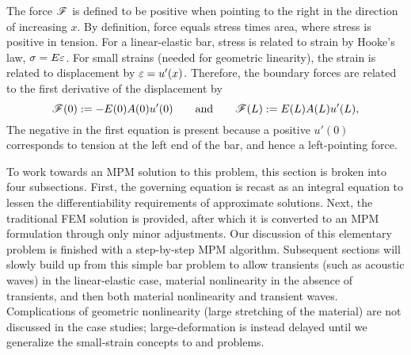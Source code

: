 %
The force $\mathscr{F}$ is defined to be positive when pointing to the right in the direction of increasing $x$. By definition, force equals stress times area, where stress is positive in tension. For a linear-elastic bar, stress \sig is related to strain \eps by Hooke's law, ${\sigma}=E {\varepsilon}$. For small strains (needed for geometric linearity), the strain is related to displacement by ${\varepsilon}=u'(x)$. Therefore, the boundary forces are related to the first derivative of the displacement by
\begin{equation}
  \mathscr{F}(0):= -E(0)A(0)u'(0)
\qquad\text{and}\qquad
  \mathscr{F}(L):=  E(L)A(L)u'(L),
\label{eq:boundaryForces}
\end{equation}
The negative in the first equation is present because a positive $u'(0)$ corresponds to tension at the left end of the bar, and hence a left-pointing force.
%


To work towards an MPM solution to this problem, this section is broken into four subsections. First, the governing equation is recast as an integral equation to lessen the differentiability requirements of approximate solutions. Next, the traditional FEM solution is provided, after which it is converted to an MPM formulation through only minor adjustments. Our discussion of this elementary problem is finished with a step-by-step MPM algorithm.  Subsequent sections will slowly build up from this simple \oneD bar problem to allow transients (such as acoustic waves) in the linear-elastic case, material nonlinearity in the absence of transients, and then both material nonlinearity and transient waves. Complications of geometric nonlinearity (\ie large stretching of the material) are not discussed in the \oneD case studies; large-deformation is instead delayed until we generalize the small-strain concepts to \twoD and \threeD problems.


